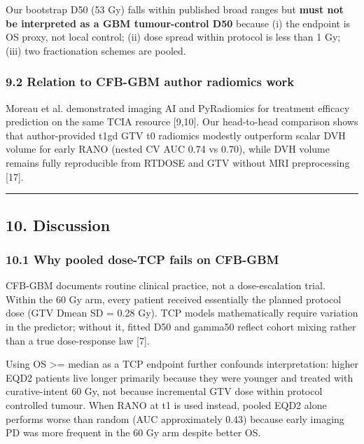 \documentclass[
  11pt,
]{article}
\begin{document}
Our bootstrap D50 (53 Gy) falls within published broad ranges but
\textbf{must not be interpreted as a GBM tumour-control D50} because (i)
the endpoint is OS proxy, not local control; (ii) dose spread within
protocol is less than 1 Gy; (iii) two fractionation schemes are pooled.

\subsubsection{9.2 Relation to CFB-GBM author radiomics
work}\label{relation-to-cfb-gbm-author-radiomics-work}

Moreau et al. demonstrated imaging AI and PyRadiomics for treatment
efficacy prediction on the same TCIA resource {[}9,10{]}. Our
head-to-head comparison shows that author-provided t1gd GTV t0 radiomics
modestly outperform scalar DVH volume for early RANO (nested CV AUC 0.74
vs 0.70), while DVH volume remains fully reproducible from RTDOSE and
GTV without MRI preprocessing {[}17{]}.

\begin{center}\rule{0.5\linewidth}{0.5pt}\end{center}

\subsection{10. Discussion}\label{discussion}

\subsubsection{10.1 Why pooled dose-TCP fails on
CFB-GBM}\label{why-pooled-dose-tcp-fails-on-cfb-gbm}

CFB-GBM documents routine clinical practice, not a dose-escalation
trial. Within the 60 Gy arm, every patient received essentially the
planned protocol dose (GTV Dmean SD = 0.28 Gy). TCP models
mathematically require variation in the predictor; without it, fitted
D50 and gamma50 reflect cohort mixing rather than a true dose-response
law {[}7{]}.

Using OS \textgreater= median as a TCP endpoint further confounds
interpretation: higher EQD2 patients live longer primarily because they
were younger and treated with curative-intent 60 Gy, not because
incremental GTV dose within protocol controlled tumour. When RANO at t1
is used instead, pooled EQD2 alone performs worse than random (AUC
approximately 0.43) because early imaging PD was more frequent in the 60
Gy arm despite better OS.
\end{document}
